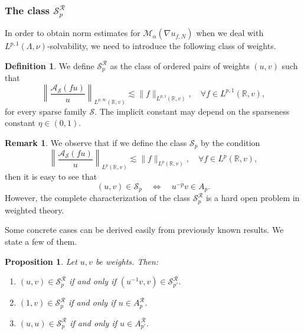 \documentclass[12pt]{amsart}
\newcommand{\R}{\mathbb{R}}
\theoremstyle{plain}
\newtheorem{proposition}[theorem]{Proposition}
\theoremstyle{definition}
\newtheorem{definition}[theorem]{Definition}
\newtheorem{remark}[theorem]{Remark}
\numberwithin{equation}{section}
\begin{document}
\subsubsection{The class \texorpdfstring{$\mathcal{S}_{p}^{\mathcal{R}}$}{}}

In order to obtain norm estimates for $ \mathcal{M}_{\alpha}(\nabla u_{f,N})$ when we deal with $L^{p,1}(\Lambda,\nu)$-solvability, we need to introduce the following class of weights.  

\begin{definition}\label{def:SpR}
        We define $\mathcal{S}_p^{\mathcal{R}}$ as the class of ordered pairs of weights $(u,v)$ such that
        \begin{equation}\label{eq:twoWeightBound}
        \left\|\frac{\mathcal{A}_{\mathcal{S}}(fu)}{u}\right\|_{L^{p,\infty}(\R,v)}
        \lesssim 
        \|f\|_{L^{p,1}(\R,v)},\quad  \forall f\in L^{p,1}(\R,v),   
        \end{equation}
        for every sparse family $\mathcal{S}$. The implicit constant may depend on the sparseness constant $\eta\in (0,1)$.
\end{definition}

\begin{remark}\label{remark:SpFuerte}
We observe  that  if we define the class $\mathcal{S}_p$ by the condition 
\[
\left\|\frac{\mathcal{A}_{\mathcal{S}}(fu)}{u}\right\|_{L^{p}(\R,v)}
\lesssim 
\|f\|_{L^{p}(\R,v)},\quad  \forall f\in L^{p}(\R,v),  
\]
then it is easy to see that 
\[
(u,v)\in \mathcal{S}_p \quad\iff\quad  u^{-p}v\in A_p.
\]
However, the complete characterization of the class $\mathcal{S}_p^{\mathcal{R}}$ is a hard open problem in weighted theory.    
\end{remark}


Some concrete cases can be derived easily from previously known results. We state a few of them.

\begin{proposition}\label{prop:dualitySpR} Let $u,v$ be weights. Then:

\begin{enumerate}

\item $(u,v)\in \mathcal{S}_p^{\mathcal{R}}$ if and only if $(u^{-1}v,v)\in \mathcal{S}_{p'}^{\mathcal{R}}$. 


\item $(1,v)\in \mathcal{S}_{p}^{\mathcal{R}}$ if and only if $u\in A_p^{\mathcal{R}}$.

\item $(u,u)\in \mathcal{S}_p^{\mathcal{R}}$ if and only if $u\in A_{p'}^{\mathcal R}$.


\end{enumerate}
\end{proposition}
\end{document}
